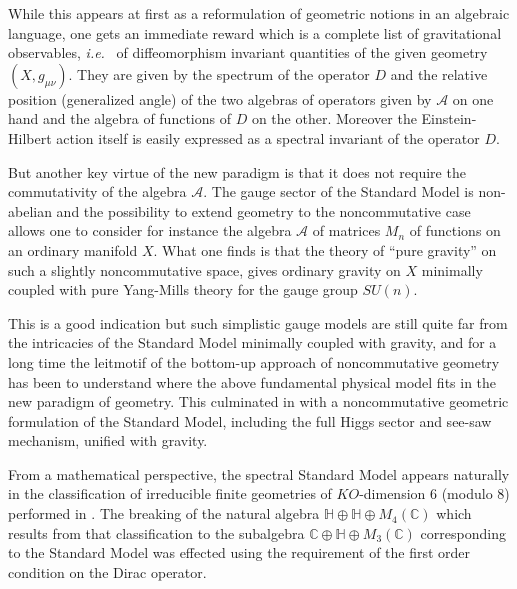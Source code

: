 \documentclass[preprint]{revtex4}
\begin{document}
While this appears at first as a reformulation of geometric notions in an algebraic language, one gets an immediate reward which is a complete list of gravitational observables, {{\it i.e.\/}\ } of diffeomorphism invariant quantities of the given geometry $(X, g_{\mu\nu})$. They are given by the spectrum of the operator $D$ and the relative position (generalized angle) of the two algebras of operators given by ${\mathcal{A}}$ on one hand and the algebra of functions of $D$ on the other.
Moreover the Einstein-Hilbert action itself is easily expressed as a spectral invariant of the operator $D$.

But another key virtue of the new paradigm is that it does not require the commutativity of the algebra ${\mathcal{A}}$. The gauge sector of the Standard Model is non-abelian and the possibility to extend geometry to the noncommutative case allows one to consider for instance the algebra ${\mathcal{A}}$ of matrices $M_n$ of functions on an ordinary manifold $X$. What one finds is that the theory of ``pure gravity'' on such a slightly noncommutative space, gives ordinary gravity on $X$ minimally coupled with pure Yang-Mills theory for the gauge group $SU(n)$.

This is a good indication but such simplistic gauge models are still quite far from the intricacies of the Standard Model minimally coupled with gravity, and for a long time the leitmotif of the bottom-up approach of noncommutative geometry has been to understand where the above fundamental physical model fits in the new paradigm of geometry. This culminated in \cite{mc2} with a noncommutative geometric formulation of the Standard Model, including the full Higgs sector and see-saw mechanism, unified with gravity.

From a mathematical perspective, the spectral Standard Model appears naturally in the classification of irreducible finite geometries of $KO$-dimension $6$ (modulo $8$) performed in \cite{CC07b}. The breaking of the natural algebra ${\mathbb{H}} \oplus {\mathbb{H}} \oplus M_4({\mathbb{C}})$ which results from that classification to the subalgebra ${\mathbb{C}} \oplus {\mathbb{H}} \oplus M_3({\mathbb{C}})$ corresponding to the Standard Model was effected using the requirement of the first order condition on the Dirac operator. 
\end{document}

